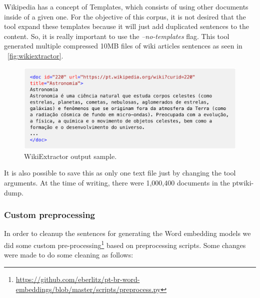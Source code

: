 Wikipedia has a concept of Templates, which consists of using other documents inside of a given one. For the objective of this corpus, it is not desired that the tool expand these templates because it will just add duplicated sentences to the content. So, it is really important to use the \textit{–no-templates} flag.
This tool generated multiple compressed 10MB files of wiki articles sentences as seen in ~\autoref{fig:wikiextractor}.

\begin{figure}[h]
    \caption{WikiExtractor output sample.}
    \label{fig:wikiextractor}
    \centering%
    \begin{minipage}{.9\textwidth}
        \includegraphics[width=\textwidth]{wikiextractor.png}
    \end{minipage}
\end{figure}

It is also possible to save this as only one text file just by changing the tool arguments.
At the time of writing, there were 1,000,400 documents in the ptwiki-dump.

\subsubsection{Custom preprocessing}

In order to cleanup the sentences for generating the Word embedding models we did some custom pre-processing\footnote{\url{https://github.com/eberlitz/pt-br-word-embeddings/blob/master/scripts/preprocess.py}} based on  preprocessing scripts. Some changes were made to do some cleaning as follows:

